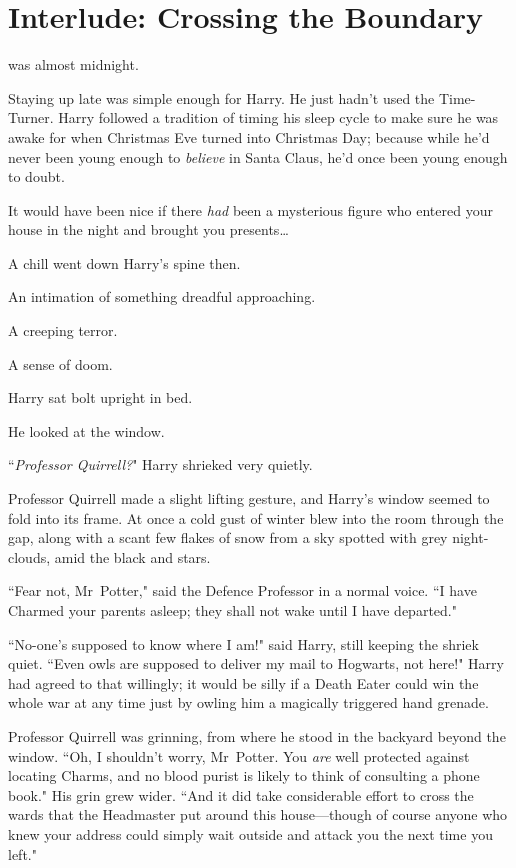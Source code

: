 \chapter{Interlude: Crossing the Boundary}

 was almost midnight.

\hplettrineextrapara
Staying up late was simple enough for Harry. He just hadn't used the Time-Turner. Harry followed a tradition of timing his sleep cycle to make sure he was awake for when Christmas Eve turned into Christmas Day; because while he'd never been young enough to \emph{believe} in Santa Claus, he'd once been young enough to doubt.

It would have been nice if there \emph{had} been a mysterious figure who entered your house in the night and brought you presents{\ldots}

A chill went down Harry's spine then.

An intimation of something dreadful approaching.

A creeping terror.

A sense of doom.

Harry sat bolt upright in bed.

He looked at the window.

``\emph{Professor Quirrell?}" Harry shrieked very quietly.

Professor Quirrell made a slight lifting gesture, and Harry's window seemed to fold into its frame. At once a cold gust of winter blew into the room through the gap, along with a scant few flakes of snow from a sky spotted with grey night-clouds, amid the black and stars.

``Fear not, Mr~Potter," said the Defence Professor in a normal voice. ``I have Charmed your parents asleep; they shall not wake until I have departed."

``No-one's supposed to know where I am!" said Harry, still keeping the shriek quiet. ``Even owls are supposed to deliver my mail to Hogwarts, not here!" Harry had agreed to that willingly; it would be silly if a Death Eater could win the whole war at any time just by owling him a magically triggered hand grenade.

Professor Quirrell was grinning, from where he stood in the backyard beyond the window. ``Oh, I shouldn't worry, Mr~Potter. You \emph{are} well protected against locating Charms, and no blood purist is likely to think of consulting a phone book." His grin grew wider. ``And it did take considerable effort to cross the wards that the Headmaster put around this house—though of course anyone who knew your address could simply wait outside and attack you the next time you left."

